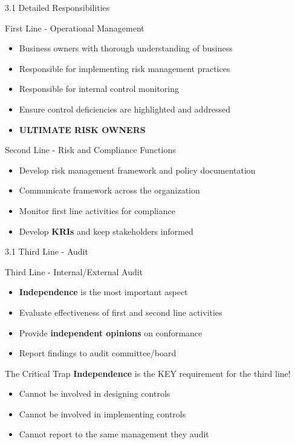 \documentclass[10pt]{beamer}  %
\begin{document}
	\begin{frame}{3.1 Detailed Responsibilities}
		\begin{block}{First Line - Operational Management}
			\begin{itemize}
				\item Business owners with thorough understanding of business
				\item Responsible for implementing risk management practices
				\item Responsible for internal control monitoring
				\item Ensure control deficiencies are highlighted and addressed
				\item \textbf{ULTIMATE RISK OWNERS}
			\end{itemize}
		\end{block}
		
		\begin{block}{Second Line - Risk and Compliance Functions}
			\begin{itemize}
				\item Develop risk management framework and policy documentation
				\item Communicate framework across the organization
				\item Monitor first line activities for compliance
				\item Develop \textbf{KRIs} and keep stakeholders informed
			\end{itemize}
		\end{block}
	\end{frame}
	
	\begin{frame}{3.1 Third Line - Audit}
		\begin{block}{Third Line - Internal/External Audit}
			\begin{itemize}
				\item \textbf{Independence} is the most important aspect
				\item Evaluate effectiveness of first and second line activities
				\item Provide \textbf{independent opinions} on conformance
				\item Report findings to audit committee/board
			\end{itemize}
		\end{block}
		
		\begin{alertblock}{The Critical Trap}
			\textbf{Independence} is the KEY requirement for the third line!
			\begin{itemize}
				\item Cannot be involved in designing controls
				\item Cannot be involved in implementing controls
				\item Cannot report to the same management they audit
			\end{itemize}
		\end{alertblock}
	\end{frame}
	
\end{document}

